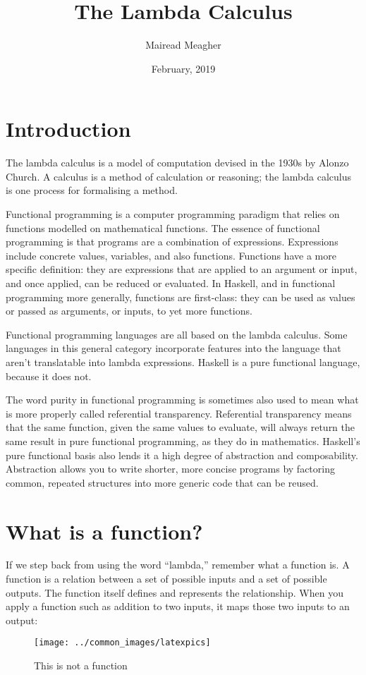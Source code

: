 \documentclass[11pt]{article}
\title{The Lambda Calculus}
\author[MM]{Mairead Meagher}
\date{February, 2019}
\begin{document}
\frame{\maketitle}

\section{Introduction}
The lambda calculus is  a model of computation devised in the 1930s by Alonzo Church. A calculus is a method of calculation or reasoning; the lambda calculus is one process for formalising a method.

Functional programming is a computer programming paradigm that relies on functions modelled on mathematical functions. The essence of functional programming is that programs are a combination of expressions. Expressions include concrete values, variables, and also functions. Functions have a more specific definition: they are expressions that are applied to an argument or input, and once applied, can be reduced or evaluated. In Haskell, and in functional programming more generally, functions are first-class: they can be used as values or passed as arguments, or inputs, to yet more functions.

Functional programming languages are all based on the lambda calculus. Some languages in this general category incorporate features into the language that aren’t translatable into lambda expressions. Haskell is a pure functional language, because it does not.

The word purity in functional programming is sometimes also used to mean what is more properly called referential transparency. Referential transparency means that the same function, given the same values to evaluate, will always return the same result in pure functional programming, as they do in mathematics.
Haskell’s pure functional basis also lends it a high degree of abstraction and composability. Abstraction allows you to write shorter, more concise programs by factoring common, repeated structures into more generic code that can be reused.
\section{What is a function?}

If we step back from using the word “lambda,” remember  what a function is. A function is a relation between a set of possible inputs and a set of possible outputs. The function itself defines and represents the relationship. When you apply a function such as addition to two inputs, it maps those two inputs to an output:
\begin{figure} [H]
	\centering
	\texttt{[image: ../common\_images/latexpics]}
	\caption{This is not a function}
	\label{fig:relation}
\end{figure}  
\end{document}
